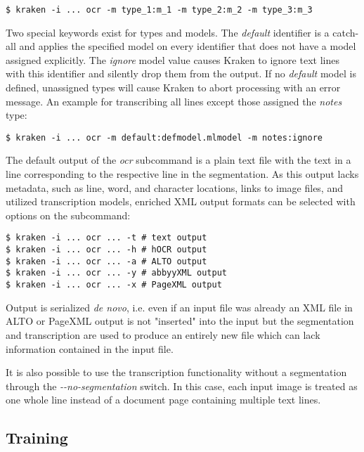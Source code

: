 \begin{verbatim}
$ kraken -i ... ocr -m type_1:m_1 -m type_2:m_2 -m type_3:m_3
\end{verbatim}

Two special keywords exist for types and models. The \emph{default} identifier
is a catch-all and applies the specified model on every identifier that does
not have a model assigned explicitly. The \emph{ignore} model value causes
Kraken to ignore text lines with this identifier and silently drop them from
the output. If no \emph{default} model is defined, unassigned types will cause
Kraken to abort processing with an error message. An example for transcribing
all lines except those assigned the \emph{notes} type:

\begin{verbatim}
$ kraken -i ... ocr -m default:defmodel.mlmodel -m notes:ignore
\end{verbatim}

The default output of the \emph{ocr} subcommand is a plain text file with the
text in a line corresponding to the respective line in the segmentation. As
this output lacks metadata, such as line, word, and character locations, links
to image files, and utilized transcription models, enriched XML output formats
can be selected with options on the subcommand:

\begin{verbatim}
$ kraken -i ... ocr ... -t # text output
$ kraken -i ... ocr ... -h # hOCR output
$ kraken -i ... ocr ... -a # ALTO output 
$ kraken -i ... ocr ... -y # abbyyXML output
$ kraken -i ... ocr ... -x # PageXML output
\end{verbatim}

Output is serialized \emph{de novo}, i.e. even if an input file was already an
XML file in ALTO or PageXML output is not "inserted" into the input but the
segmentation and transcription are used to produce an entirely new file which
can lack information contained in the input file.

It is also possible to use the transcription functionality without a
segmentation through the \emph{-{}-no-segmentation} switch. In this case, each
input image is treated as one whole line instead of a document page containing
multiple text lines. 

\subsection{Training}

